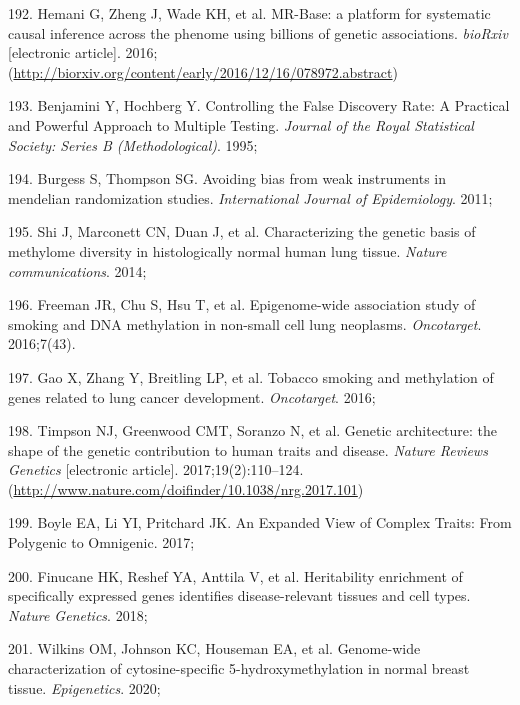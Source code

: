\documentclass[11pt,oneside]{bristolthesis}
\newenvironment{cslreferences}%
  {}%
  {\par}
\begin{document}
\begin{cslreferences}
\leavevmode\hypertarget{ref-Hemani2016}{}%
192. Hemani G, Zheng J, Wade KH, et al. MR-Base: a platform for systematic causal inference across the phenome using billions of genetic associations. \emph{bioRxiv} {[}electronic article{]}. 2016;(\url{http://biorxiv.org/content/early/2016/12/16/078972.abstract})

\leavevmode\hypertarget{ref-Benjamini1995}{}%
193. Benjamini Y, Hochberg Y. Controlling the False Discovery Rate: A Practical and Powerful Approach to Multiple Testing. \emph{Journal of the Royal Statistical Society: Series B (Methodological)}. 1995;

\leavevmode\hypertarget{ref-Burgess2011}{}%
194. Burgess S, Thompson SG. Avoiding bias from weak instruments in mendelian randomization studies. \emph{International Journal of Epidemiology}. 2011;

\leavevmode\hypertarget{ref-Shi2014}{}%
195. Shi J, Marconett CN, Duan J, et al. Characterizing the genetic basis of methylome diversity in histologically normal human lung tissue. \emph{Nature communications}. 2014;

\leavevmode\hypertarget{ref-Freeman2016}{}%
196. Freeman JR, Chu S, Hsu T, et al. Epigenome-wide association study of smoking and DNA methylation in non-small cell lung neoplasms. \emph{Oncotarget}. 2016;7(43).

\leavevmode\hypertarget{ref-Gao2016}{}%
197. Gao X, Zhang Y, Breitling LP, et al. Tobacco smoking and methylation of genes related to lung cancer development. \emph{Oncotarget}. 2016;

\leavevmode\hypertarget{ref-Timpson2017}{}%
198. Timpson NJ, Greenwood CMT, Soranzo N, et al. Genetic architecture: the shape of the genetic contribution to human traits and disease. \emph{Nature Reviews Genetics} {[}electronic article{]}. 2017;19(2):110--124. (\url{http://www.nature.com/doifinder/10.1038/nrg.2017.101})

\leavevmode\hypertarget{ref-Boyle2017}{}%
199. Boyle EA, Li YI, Pritchard JK. An Expanded View of Complex Traits: From Polygenic to Omnigenic. 2017;

\leavevmode\hypertarget{ref-Finucane2018}{}%
200. Finucane HK, Reshef YA, Anttila V, et al. Heritability enrichment of specifically expressed genes identifies disease-relevant tissues and cell types. \emph{Nature Genetics}. 2018;

\leavevmode\hypertarget{ref-Wilkins2020}{}%
201. Wilkins OM, Johnson KC, Houseman EA, et al. Genome-wide characterization of cytosine-specific 5-hydroxymethylation in normal breast tissue. \emph{Epigenetics}. 2020;


\end{cslreferences}
\end{document}
